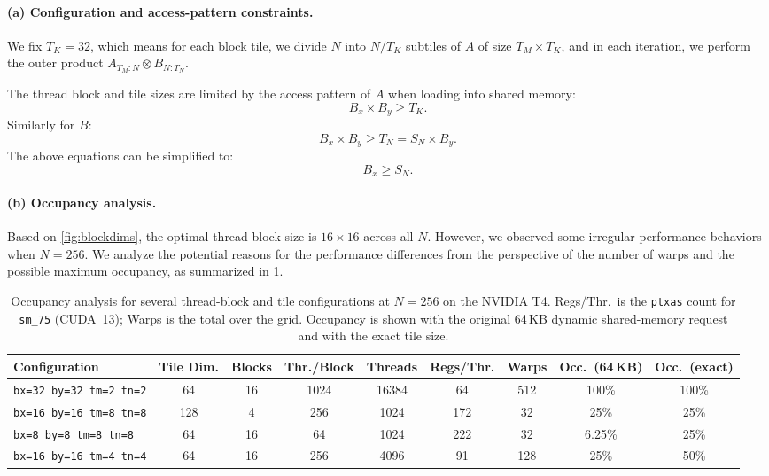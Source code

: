 \documentclass[letterpaper,twocolumn,10pt]{article}
\begin{document}
\paragraph{(a) Configuration and access-pattern constraints.}
We fix $T_K = 32$, which means for each block tile, we divide $N$ into $N/T_K$
subtiles of $A$ of size $T_M \times T_K$, and in each iteration, we perform the outer
product $A_{T_M:N} \otimes B_{N:T_N}$.

The thread block and tile sizes are limited by the access pattern of $A$ when loading
into shared memory:
\begin{equation*}
B_x \times B_y \geq T_K.
\end{equation*}
Similarly for $B$:
\begin{equation*}
B_x \times B_y \geq T_N = S_N \times B_y.
\end{equation*}
The above equations can be simplified to:
\begin{equation*}
B_x \geq S_N.
\end{equation*}

\paragraph{(b) Occupancy analysis.}
Based on \cref{fig:blockdims}, the optimal thread block size is $16\times16$ across
all $N$. However, we observed some irregular performance behaviors when $N=256$. We
analyze the potential reasons for the performance differences from the perspective of
the number of warps and the possible maximum occupancy, as summarized in
\cref{tab:occupancy}.

\begin{table}[t]
\centering
\caption{Occupancy analysis for several thread-block and tile configurations at
$N=256$ on the NVIDIA T4. Regs/Thr.\ is the \texttt{ptxas} count for
\texttt{sm\_75} (CUDA~13); Warps is the total over the grid. Occupancy is shown with
the original 64\,KB dynamic shared-memory request and with the exact tile size.}
\label{tab:occupancy}
\small
\begin{tabular}{@{}l c c c c c c c c@{}}
\toprule
\textbf{Configuration} & \textbf{Tile Dim.} & \textbf{Blocks} &
\textbf{Thr./Block} & \textbf{Threads} & \textbf{Regs/Thr.} &
\textbf{Warps} & \textbf{Occ.\ (64\,KB)} & \textbf{Occ.\ (exact)} \\
\midrule
\texttt{bx=32 by=32 tm=2 tn=2} & 64  & 16 & 1024 & 16384 & 64  & 512 & 100\%  & 100\% \\
\texttt{bx=16 by=16 tm=8 tn=8} & 128 & 4  & 256  & 1024  & 172 & 32  & 25\%   & 25\%  \\
\texttt{bx=8 by=8 tm=8 tn=8}   & 64  & 16 & 64   & 1024  & 222 & 32  & 6.25\% & 25\%  \\
\texttt{bx=16 by=16 tm=4 tn=4} & 64  & 16 & 256  & 4096  & 91  & 128 & 25\%   & 50\%  \\
\bottomrule
\end{tabular}
\end{table}
\end{document}
